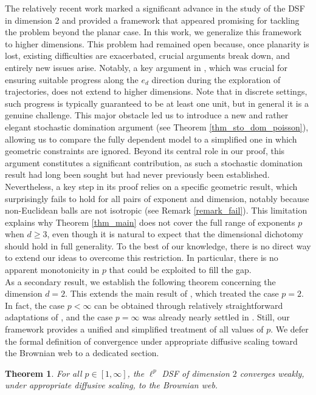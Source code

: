 \documentclass[a4paper, 11pt]{article}
\theoremstyle{plain}
\newtheorem{Theorem}{Theorem}[section]
\theoremstyle{definition}
\numberwithin{equation}{section}
\begin{document}
The relatively recent work \cite{Dsf2d} marked a significant advance in the study of the DSF in dimension 2 and provided a framework that appeared promising for tackling the problem beyond the planar case. In this work, we generalize this framework to higher dimensions. This problem had remained open because, once planarity is lost, existing difficulties are exacerbated, crucial arguments break down, and entirely new issues arise. Notably, a key argument in \cite{Dsf2d}, which was crucial for ensuring suitable progress along the $e_d$ direction during the exploration of trajectories, does not extend to higher dimensions. Note that in discrete settings, such progress is typically guaranteed to be at least one unit, but in general it is a genuine challenge. This major obstacle led us to introduce a new and rather elegant stochastic domination argument (see Theorem \ref{thm_sto_dom_poisson}), allowing us to compare the fully dependent model to a simplified one in which geometric constraints are ignored. Beyond its central role in our proof, this argument constitutes a significant contribution, as such a stochastic domination result had long been sought but had never previously been established. Nevertheless, a key step in its proof relies on a specific geometric result, which surprisingly fails to hold for all pairs of exponent and dimension, notably because non-Euclidean balls are not isotropic (see Remark \ref{remark_fail}). This limitation explains why Theorem \ref{thm_main} does not cover the full range of exponents $p$ when $d\geq 3$, even though it is natural to expect that the dimensional dichotomy should hold in full generality. To the best of our knowledge, there is no direct way to extend our ideas to overcome this restriction. In particular, there is no apparent monotonicity in $p$ that could be exploited to fill the gap.\\

As a secondary result, we establish the following theorem concerning the dimension $d=2$. This extends the main result of \cite{Dsf2d}, which treated the case $p=2$. In fact, the case $p<\infty$ can be obtained through relatively straightforward adaptations of \cite{Dsf2d}, and the case $p=\infty$ was already nearly settled in \cite{DsfInfinity}. Still, our framework provides a unified and simplified treatment of all values of $p$. We defer the formal definition of convergence under appropriate diffusive scaling toward the Brownian web to a dedicated section.


\begin{Theorem}
    \label{thm_main2}
    For all $p\in[1, \infty]$, the $\ell^p$ DSF of dimension $2$ converges weakly, under appropriate diffusive scaling, to the Brownian web.
\end{Theorem}
\end{document}
